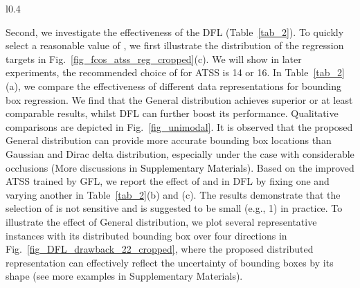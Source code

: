 \documentclass{article}
\begin{document}
\begin{wrapfigure}{l}{0.4\textwidth}
\vspace{-14pt}
  \begin{center}
  \renewcommand\arraystretch{1.2}
        \setlength{\fboxrule}{0pt}
		\vspace{-4pt}
		\label{tab:qfl_dfl_atss}
	\end{center}
\vspace{-12pt}
\end{wrapfigure}
Second, we investigate the effectiveness of the DFL (Table~\ref{tab_2}). To quickly select a reasonable value of , we first illustrate the distribution of the regression targets in Fig.~\ref{fig_fcos_atss_reg_cropped}(c). We will show in later experiments, the recommended choice of  for ATSS is 14 or 16. In Table~\ref{tab_2}(a), we compare the effectiveness of different data representations for bounding box regression. We find that the General distribution achieves superior or at least comparable results, whilst DFL can further boost its performance. Qualitative comparisons are depicted in Fig.~\ref{fig_unimodal}. It is observed that the proposed General distribution can provide more accurate bounding box locations than Gaussian and Dirac delta distribution, especially under the case with considerable occlusions (More discussions in \textcolor{black}{Supplementary Materials}). Based on the improved ATSS trained 
by GFL, we report the effect of  and  in DFL by fixing one and varying another in Table~\ref{tab_2}(b) and (c). The results demonstrate that the selection of  is not sensitive and  is suggested to be small (e.g., 1) in practice. To illustrate the effect of General distribution, we plot several representative instances with its distributed bounding box over four directions in Fig.~\ref{fig_DFL_drawback_22_cropped}, where the proposed distributed representation can effectively reflect the uncertainty of bounding boxes by its shape (see more examples in Supplementary Materials).  
\end{document}
